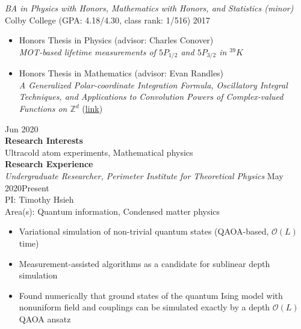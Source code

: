 \documentclass[10pt]{article}
\begin{document}
\noindent \textit{BA in Physics with Honors, Mathematics with Honors, and Statistics (minor)}\\
Colby College (GPA: 4.18/4.30, class rank: 1/516) \hfill 2017\vspace{-2pt}

\begin{itemize}
	\setlength\itemsep{-1pt}
	\item Honors Thesis in Physics (advisor: Charles Conover)\\
	\textit{MOT-based lifetime measurements of $5P_{1/2}$ and $5P_{3/2}$ in $^{39}K$}
	
	\item Honors Thesis in Mathematics (advisor: Evan Randles)\\ 
	\indent \textit{A Generalized Polar-coordinate Integration Formula, Oscillatory Integral Techniques, and Applications to Convolution Powers of Complex-valued Functions on $\mathbb{Z}^d$} (\href{https://digitalcommons.colby.edu/honorstheses/1293/}{link})
\end{itemize}



\hfill  Jun 2020\\




\noindent \large{\textbf{{Research Interests}}}   \normalsize \\  
\noindent Ultracold atom experiments, Mathematical physics\\



\noindent \large{\textbf{{Research Experience}}}   \normalsize \\  
\noindent \textit{Undergraduate Researcher, Perimeter Institute for Theoretical Physics} \hfill May 2020\textendash Present\\
PI: Timothy Hsieh \\
Area(s): Quantum information, Condensed matter physics \vspace{-5pt}
\begin{itemize}
	\setlength\itemsep{-4pt}
	\item Variational simulation of non-trivial quantum states (QAOA-based, $\mathcal{O}(L)$ time)  
	\item Measurement-assisted algorithms as a candidate for sublinear depth simulation  
	\item Found numerically that ground states of the quantum Ising model with nonuniform field and couplings can be simulated exactly by a depth $\mathcal{O}(L)$ QAOA ansatz
\end{itemize}
\end{document}
